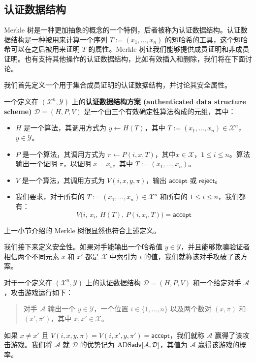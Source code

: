 \subsection{认证数据结构}\label{subsec:8-9-1}

Merkle 树是一种更加抽象的概念的一个特例，后者被称为认证数据结构。认证数据结构是一种被用来计算一个序列 $T:=(x_1,\dots,x_n)$ 的短哈希的工具，这个短哈希可以在之后被用来证明 $T$ 的属性。Merkle 树让我们能够提供成员证明和非成员证明。也有支持其他操作的认证数据结构，比如有效插入和删除，我们将在下面讨论。

我们首先定义一个用于集合成员证明的认证数据结构，并讨论其安全属性。

\begin{definition}\label{def:8-3}
一个定义在 $(\mathcal{X}^n,\mathcal{Y})$ 上的\textbf{认证数据结构方案 (authenticated data structure scheme)} $\mathcal{D}=(H,P,V)$ 是一个由三个有效确定性算法构成的元组，其中：
\begin{itemize}
	\item $H$ 是一个算法，其调用方式为 $y\leftarrow H(T)$，其中 $T:=(x_1,\dots,x_n)\in\mathcal{X}^n$，$y\in\mathcal{Y}$。
	\item $P$ 是一个算法，其调用方式为 $\pi\leftarrow P(i,x,T)$，其中$x\in\mathcal{X}$，$1\leq i\leq n$。算法输出一个证明 $\pi$，以证明 $x=x_i$，其中 $T:=(x_1,\dots,x_n)$。
	\item $V$ 是一个算法，其调用方式为 $V(i,x,y,\pi)$，输出 $\mathsf{accept}$ 或 $\mathsf{reject}$。
	\item 我们要求，对于所有的 $T:=(x_1,\dots,x_n)\in\mathcal{X}^n$ 和所有的 $1\leq i\leq n$，我们都有：
	\[
	V\big(i,\,x_i,\,H(T),\,P(i,x_i,T)\big)=\mathsf{accept}
	\]
\end{itemize}
\end{definition}

上一小节介绍的 Merkle 树很显然也符合上述定义。

我们接下来定义安全性。如果对手能输出一个哈希值 $y\in\mathcal{Y}$，并且能够欺骗验证者相信两个不同元素 $x$ 和 $x'$ 都是 $\mathcal{X}$ 中索引为 $i$ 的值，我们就称该对手攻破了该方案。

\begin{game}[认证数据结构安全性]\label{game:8-2}
对于一个定义在 $(\mathcal{X}^n,\mathcal{Y})$ 上的认证数据结构 $\mathcal{D}=(H,P,V)$ 和一个给定对手 $\mathcal{A}$，攻击游戏运行如下：
\begin{quote}
对手 $\mathcal{A}$ 输出一个 $y\in\mathcal{Y}$，一个位置 $i\in\{1,\dots,n\}$ 以及两个数对 $(x,\pi)$ 和 $(x',\pi')$，其中 $x,x'\in\mathcal{X}$。
\end{quote}
如果 $x\neq x'$ 且 $V(i,x,y,\pi)=V(i,x',y,\pi')=\mathsf{accept}$，我们就称 $\mathcal{A}$ 赢得了该攻击游戏。我们将 $\mathcal{A}$ 就 $\mathcal{D}$ 的优势记为 ${\rm ADS}\mathsf{adv}[\mathcal{A},\mathcal{D}]$，其值为 $\mathcal{A}$ 赢得该游戏的概率。
\end{game}


